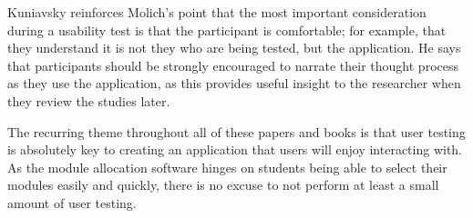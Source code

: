 Kuniavsky reinforces Molich's point that the most important consideration
during a usability test is that the participant is comfortable; for example,
that they understand it is not they who are being tested, but the application.
He says that participants should be strongly encouraged to narrate their
thought process as they use the application, as this provides useful insight
to the researcher when they review the studies later.

The recurring theme throughout all of these papers and books is that user
testing is absolutely key to creating an application that users will enjoy
interacting with. As the module allocation software hinges on students being
able to select their modules easily and quickly, there is no excuse to not
perform at least a small amount of user testing.
